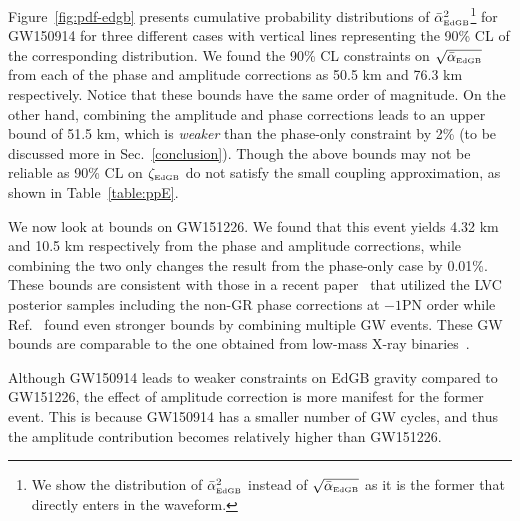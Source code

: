 \documentclass[prd,twocolumn,nofootinbib]{revtex4-1}
\newcommand{\EDGB}{{\mbox{\tiny EdGB}}}
\begin{document}
Figure~\ref{fig:pdf-edgb} presents cumulative probability distributions of $\bar{\alpha}^2_{\EDGB}$\footnote{We show the distribution of $\bar{\alpha}^2_{\EDGB}$ instead of $\sqrt{\bar{\alpha}_{\EDGB}}$ as it is the former that directly enters in the waveform.} for GW150914 for three different cases with vertical lines representing the 90\% CL of the corresponding distribution. We found the 90\% CL constraints on  $\sqrt{\bar{\alpha}_{\EDGB}}$ from each of the phase and amplitude corrections as 50.5 km and 76.3 km respectively. Notice that these bounds have the same order of magnitude. On the other hand, combining the amplitude and phase corrections leads to an upper bound of 51.5 km, which is \emph{weaker} than the  phase-only constraint by 2\% (to be discussed more in Sec.~\ref{conclusion}). 
Though the above bounds may not be reliable as 90\% CL on $\zeta_\EDGB$ do not satisfy the small coupling approximation, as shown in Table~\ref{table:ppE}.

We now look at bounds on GW151226. We found that this event yields 4.32 km and 10.5 km respectively from the phase and amplitude corrections, while combining the two only changes the result from the phase-only case by 0.01\%. These bounds are consistent with those in a recent paper~\cite{Nair:2019iur} that utilized the LVC posterior samples including the non-GR phase corrections at $-1$PN order while Ref.~\cite{Yamada:2019zrb} found even stronger bounds by combining multiple GW events. These GW bounds are comparable to the one obtained from low-mass X-ray binaries~\cite{Yagi:2012gp}. 

Although GW150914 leads to weaker constraints on EdGB gravity compared to GW151226, the effect of amplitude correction is more manifest for the former event. This is because GW150914 has a smaller number of GW cycles, and thus the amplitude contribution becomes relatively higher than GW151226.

\end{document}

